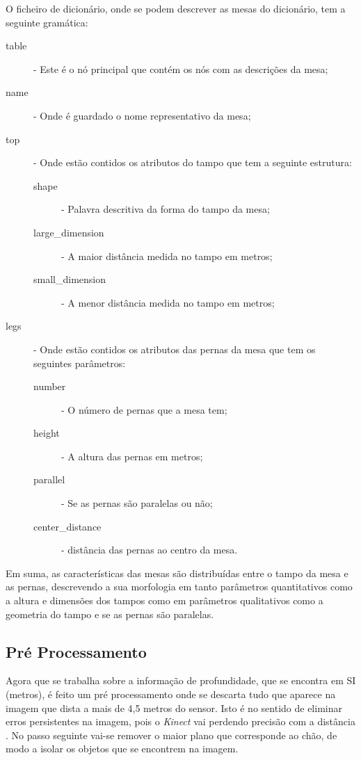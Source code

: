 \vspace*{12mm}



O ficheiro de dicionário, onde se podem descrever as mesas do dicionário, tem a seguinte gramática:

\begin{description}
	\item [table] - Este é o nó principal que contém os nós com as descrições da mesa;
	\item [name] - Onde é guardado o nome representativo da mesa;
	\item [top] - Onde estão contidos os atributos do tampo que tem a seguinte estrutura:
	\begin{description} 
		\item [shape] - Palavra descritiva da forma do tampo da mesa;
		\item [large\_dimension] - A maior distância medida no tampo em metros; 
		\item [small\_dimension] - A menor distância medida no tampo em metros;
	\end{description} 
	\item [legs] - Onde estão contidos os atributos das pernas da mesa que tem os seguintes parâmetros:
	\begin{description} 
		\item [number] - O número de pernas que a mesa tem;
		\item [height] -  A altura das pernas em metros;
		\item [parallel] - Se as pernas são paralelas ou não;
		\item [center\_distance] - distância das pernas ao centro da mesa.
	\end{description} 
\end{description}

Em suma, as características das mesas são distribuídas entre o tampo da mesa e as pernas, descrevendo a sua morfologia em tanto parâmetros quantitativos como a altura e dimensões dos tampos como em parâmetros qualitativos como a geometria do tampo e se as pernas são paralelas.


\subsection{Pré Processamento}

Agora que se trabalha sobre a informação de profundidade, que se encontra em SI (metros), é feito um pré processamento onde se descarta tudo que aparece na imagem que dista a mais de 4,5 metros do sensor. Isto é no sentido de eliminar erros persistentes na imagem, pois o \emph{Kinect} vai perdendo precisão com a distância \cite{s120201437}. No passo seguinte vai-se remover o maior plano que corresponde ao chão, de modo a isolar os objetos que se encontrem na imagem.


